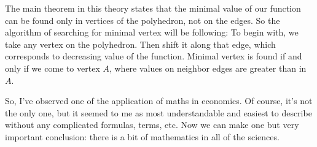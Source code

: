 \documentclass[a4paper,12pt]{article}
\begin{document}
The main theorem in this theory states that the minimal value of our function can be found only in vertices of the polyhedron, not on the edges.
So the algorithm of searching for minimal vertex will be following: To begin with, we take any vertex on the polyhedron. Then shift it along that edge,
which corresponds to decreasing value of the function. Minimal vertex is found if and only if we come to vertex $A$, where values on neighbor edges are
greater than in $A$.

So, I've observed one of the application of maths in economics. Of course, it's not the only one, but it seemed to me as most understandable and easiest
to describe without any complicated formulas, terms, etc.  Now we can make one but very important conclusion: there is a bit of mathematics in all of the
sciences.
\end{document}
